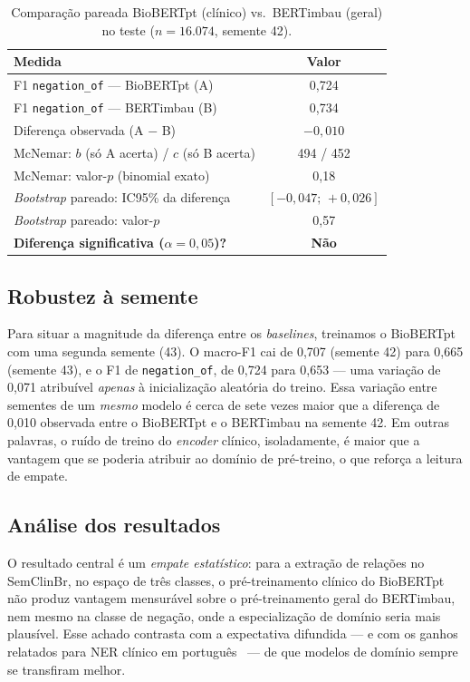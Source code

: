 \documentclass[12pt]{article}
\begin{document}
\begin{table}[ht]
\centering
\caption{Comparação pareada BioBERTpt (clínico) vs.\ BERTimbau (geral) no teste
($n=16.074$, semente 42).}
\label{tab:signif}
\begin{tabular}{lc}
\toprule
\textbf{Medida} & \textbf{Valor} \\
\midrule
F1 \texttt{negation\_of} --- BioBERTpt (A) & 0,724 \\
F1 \texttt{negation\_of} --- BERTimbau (B) & 0,734 \\
Diferença observada (A $-$ B) & $-0,010$ \\
McNemar: $b$ (só A acerta) / $c$ (só B acerta) & 494 / 452 \\
McNemar: valor-$p$ (binomial exato) & 0,18 \\
\emph{Bootstrap} pareado: IC95\% da diferença & $[-0,047;\,+0,026]$ \\
\emph{Bootstrap} pareado: valor-$p$ & 0,57 \\
\textbf{Diferença significativa ($\alpha=0,05$)?} & \textbf{Não} \\
\bottomrule
\end{tabular}
\end{table}

\subsection{Robustez à semente}
Para situar a magnitude da diferença entre os \emph{baselines}, treinamos o
BioBERTpt com uma segunda semente (43). O macro-F1 cai de 0,707 (semente 42) para
0,665 (semente 43), e o F1 de \texttt{negation\_of}, de 0,724 para 0,653 --- uma
variação de 0,071 atribuível \emph{apenas} à inicialização aleatória do treino.
Essa variação entre sementes de um \emph{mesmo} modelo é cerca de sete vezes
maior que a diferença de 0,010 observada entre o BioBERTpt e o BERTimbau na
semente 42. Em outras palavras, o ruído de treino do \emph{encoder} clínico,
isoladamente, é maior que a vantagem que se poderia atribuir ao domínio de
pré-treino, o que reforça a leitura de empate.

\subsection{Análise dos resultados}
O resultado central é um \emph{empate estatístico}: para a extração de relações
no SemClinBr, no espaço de três classes, o pré-treinamento clínico do BioBERTpt
não produz vantagem mensurável sobre o pré-treinamento geral do BERTimbau, nem
mesmo na classe de negação, onde a especialização de domínio seria mais
plausível. Esse achado contrasta com a expectativa difundida --- e com os ganhos
relatados para NER clínico em português~\cite{schneider:20} --- de que modelos de
domínio sempre se transfiram melhor.
\end{document}
